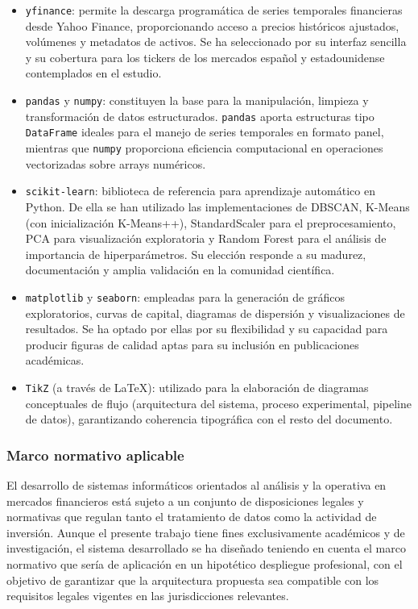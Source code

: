 \documentclass[
]{article}
\begin{document}
\begin{itemize}
\item \texttt{yfinance}: permite la descarga programática de series temporales financieras desde Yahoo Finance, proporcionando acceso a precios históricos ajustados, volúmenes y metadatos de activos. Se ha seleccionado por su interfaz sencilla y su cobertura para los tickers de los mercados español y estadounidense contemplados en el estudio.

\item \texttt{pandas} y \texttt{numpy}: constituyen la base para la manipulación, limpieza y transformación de datos estructurados. \texttt{pandas} aporta estructuras tipo \texttt{DataFrame} ideales para el manejo de series temporales en formato panel, mientras que \texttt{numpy} proporciona eficiencia computacional en operaciones vectorizadas sobre arrays numéricos.

\item \texttt{scikit-learn}: biblioteca de referencia para aprendizaje automático en Python. De ella se han utilizado las implementaciones de DBSCAN, K-Means (con inicialización K-Means++), StandardScaler para el preprocesamiento, PCA para visualización exploratoria y Random Forest para el análisis de importancia de hiperparámetros. Su elección responde a su madurez, documentación y amplia validación en la comunidad científica.

\item \texttt{matplotlib} y \texttt{seaborn}: empleadas para la generación de gráficos exploratorios, curvas de capital, diagramas de dispersión y visualizaciones de resultados. Se ha optado por ellas por su flexibilidad y su capacidad para producir figuras de calidad aptas para su inclusión en publicaciones académicas.

\item \texttt{TikZ} (a través de LaTeX): utilizado para la elaboración de diagramas conceptuales de flujo (arquitectura del sistema, proceso experimental, pipeline de datos), garantizando coherencia tipográfica con el resto del documento.
\end{itemize}

\subsubsection{Marco normativo aplicable}

El desarrollo de sistemas informáticos orientados al análisis y la operativa en mercados financieros está sujeto a un conjunto de disposiciones legales y normativas que regulan tanto el tratamiento de datos como la actividad de inversión. Aunque el presente trabajo tiene fines exclusivamente académicos y de investigación, el sistema desarrollado se ha diseñado teniendo en cuenta el marco normativo que sería de aplicación en un hipotético despliegue profesional, con el objetivo de garantizar que la arquitectura propuesta sea compatible con los requisitos legales vigentes en las jurisdicciones relevantes.
\end{document}
